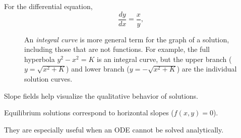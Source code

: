 \begin{example}
For the differential equation,
\[
\frac{dy}{dx} =\frac{x}{y},
\]
\end{example}
\begin{figure}[h]
\caption{
    An \emph{integral curve} is more general term for the graph of a solution, including those that are not functions. For example, the full hyperbola \(y^{2}-x^{2}=K\) is an integral curve, but the upper branch (\(y=\sqrt{x^{2}+K}\)) and lower branch (\(y=-\sqrt{x^{2}+K}\)) are the individual solution curves.}
\end{figure}


\begin{compactitem}
    \item Slope fields help visualize the qualitative behavior of solutions.
    \item Equilibrium solutions correspond to horizontal slopes ($f(x,y)=0$).
    \item They are especially useful when an ODE cannot be solved analytically.
\end{compactitem}


